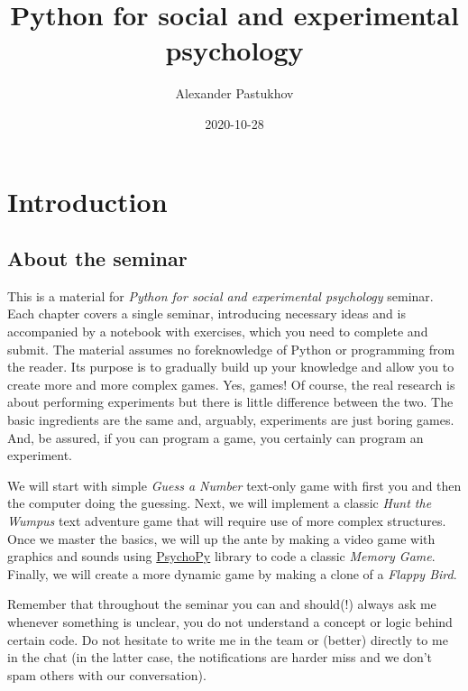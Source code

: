 \documentclass[
]{book}
\title{Python for social and experimental psychology}
\author{Alexander Pastukhov}
\date{2020-10-28}
\begin{document}
\maketitle

{
\setcounter{tocdepth}{1}
\tableofcontents
}
\hypertarget{introduction}{%
\chapter*{Introduction}\label{introduction}}

\hypertarget{about-the-seminar}{%
\section*{About the seminar}\label{about-the-seminar}}

This is a material for \emph{Python for social and experimental psychology} seminar. Each chapter covers a single seminar, introducing necessary ideas and is accompanied by a notebook with exercises, which you need to complete and submit. The material assumes no foreknowledge of Python or programming from the reader. Its purpose is to gradually build up your knowledge and allow you to create more and more complex games. Yes, games! Of course, the real research is about performing experiments but there is little difference between the two. The basic ingredients are the same and, arguably, experiments are just boring games. And, be assured, if you can program a game, you certainly can program an experiment.

We will start with simple \emph{Guess a Number} text-only game with first you and then the computer doing the guessing. Next, we will implement a classic \emph{Hunt the Wumpus} text adventure game that will require use of more complex structures. Once we master the basics, we will up the ante by making a video game with graphics and sounds using \href{https://psychopy.org/}{PsychoPy} library to code a classic \emph{Memory Game}. Finally, we will create a more dynamic game by making a clone of a \emph{Flappy Bird}.

Remember that throughout the seminar you can and should(!) always ask me whenever something is unclear, you do not understand a concept or logic behind certain code. Do not hesitate to write me in the team or (better) directly to me in the chat (in the latter case, the notifications are harder miss and we don't spam others with our conversation).
\end{document}
